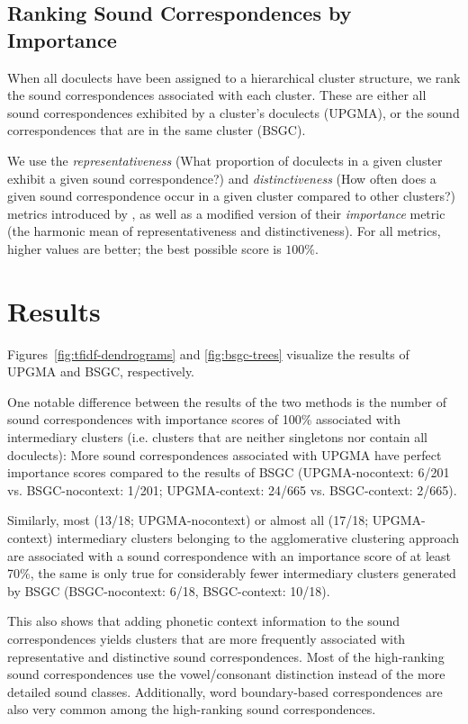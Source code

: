 \documentclass[a4paper, 11pt]{article}
\begin{document}
\subsection{Ranking Sound Correspondences by Importance}

When all doculects have been assigned to a hierarchical cluster structure,
we rank the sound correspondences associated with each cluster.
These are either
all sound correspondences exhibited by a cluster's doculects (UPGMA),
or the sound correspondences that are in the same cluster (BSGC).

We use the \textit{representativeness} (What proportion of doculects in a given cluster exhibit a given sound correspondence?) and \textit{distinctiveness} (How often does a given sound correspondence occur in a given cluster compared to other clusters?) metrics
introduced by \citet{wieling2011bipartite},
as well as a modified version of their \textit{importance} metric 
(the harmonic mean of representativeness and distinctiveness).
For all metrics, higher values are better; the best possible score is $100 \%$.

\section{Results}

Figures~\ref{fig:tfidf-dendrograms} and \ref{fig:bsgc-trees} visualize the results of UPGMA and BSGC, respectively.

One notable difference between the results of the two methods is the number 
of sound correspondences with importance scores of 100\% 
associated with intermediary clusters
(i.e. clusters that are neither singletons nor contain all doculects):
More sound correspondences associated with UPGMA have perfect importance scores compared to the results of BSGC (UPGMA-nocontext: 6/201 vs. BSGC-nocontext: 1/201; UPGMA-context: 24/665 vs. BSGC-context: 2/665).

Similarly, most (13/18; UPGMA-nocontext) or almost all (17/18; UPGMA-context) intermediary clusters belonging to the agglomerative clustering approach
are associated with a sound correspondence with an importance score of at least 70\%,
the same is only true for considerably fewer intermediary clusters generated by BSGC (BSGC-nocontext: 6/18, BSGC-context: 10/18).

This also shows that adding phonetic context information
to the sound correspondences yields clusters
that are more frequently associated with representative and distinctive
sound correspondences.
Most of the high-ranking sound correspondences
use the vowel/consonant distinction instead of
the more detailed sound classes.
Additionally, word boundary-based correspondences are also very common
among the high-ranking sound correspondences.
\end{document}
